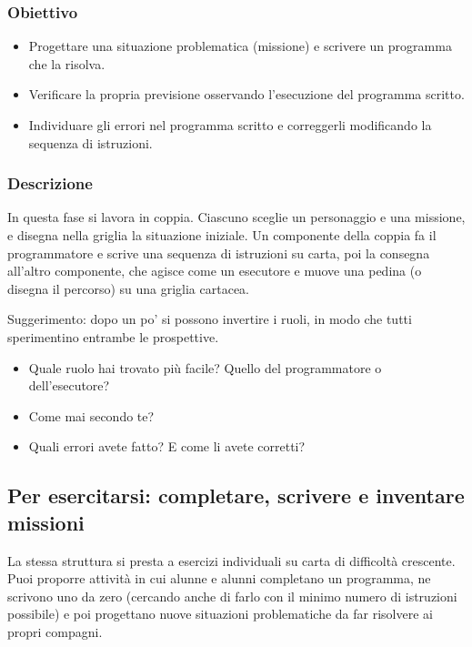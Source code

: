 \subsubsection{Obiettivo}\label{obiettivo-3}

\begin{itemize}
\item
  Progettare una situazione problematica (missione) e scrivere un programma che la risolva.
\item
  Verificare la propria previsione osservando l'esecuzione del programma scritto.
\item
  Individuare gli errori nel programma scritto e correggerli modificando la sequenza di istruzioni.
\end{itemize}

\subsubsection{Descrizione}\label{descrizione-3}

In questa fase si lavora in coppia. Ciascuno sceglie un personaggio e una missione, e disegna nella griglia la situazione iniziale. Un componente della coppia fa il programmatore e scrive una sequenza di istruzioni su carta, poi la consegna all'altro componente, che agisce come un esecutore e muove una pedina (o disegna il percorso) su una griglia cartacea.

Suggerimento: dopo un po' si possono invertire i ruoli, in modo che tutti sperimentino entrambe le prospettive.

\begin{domandestimolo}\label{domande-stimolo-7}

\begin{itemize}
\item
  Quale ruolo hai trovato più facile? Quello del programmatore o dell'esecutore?
\item
  Come mai secondo te?
\item
  Quali errori avete fatto? E come li avete corretti?
\end{itemize}
\end{domandestimolo}

\subsection{Per esercitarsi: completare, scrivere e inventare missioni}

La stessa struttura si presta a esercizi individuali su carta di difficoltà crescente. Puoi proporre attività in cui alunne e alunni completano un programma, ne scrivono uno da zero (cercando anche di farlo con il minimo numero di istruzioni possibile) e poi progettano nuove situazioni problematiche da far risolvere ai propri compagni.


